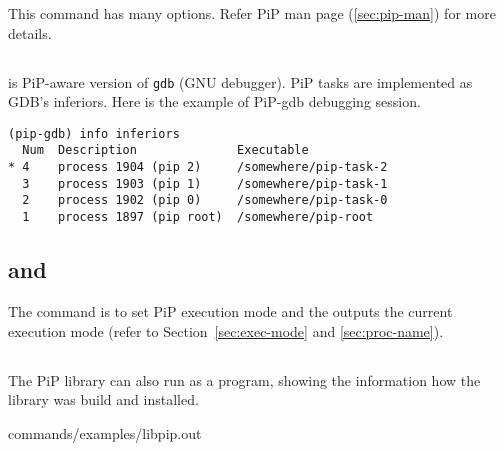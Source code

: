 This  command has many options. Refer PiP man page
(\ref{sec:pip-man}) for more details. 

\subsection{}\label{sec:pip-gdb}

 is PiP-aware version of {\tt gdb} (GNU
debugger). PiP tasks are implemented as GDB's inferiors. Here is the
example of PiP-gdb debugging session.

\begin{lstlisting}[frame=tRBl]
(pip-gdb) info inferiors
  Num  Description              Executable
* 4    process 1904 (pip 2)     /somewhere/pip-task-2
  3    process 1903 (pip 1)     /somewhere/pip-task-1
  2    process 1902 (pip 0)     /somewhere/pip-task-0
  1    process 1897 (pip root)  /somewhere/pip-root
\end{lstlisting}

\subsection{ and }\label{sec:pip-mode}

The  command is to set PiP execution mode and the
 outputs the current execution mode (refer to
Section~\ref{sec:exec-mode} and \ref{sec:proc-name}). 

\subsection{}

The PiP library  can also run as a program, showing the
information how the library was build and installed.


                {commands/examples/libpip.out}
